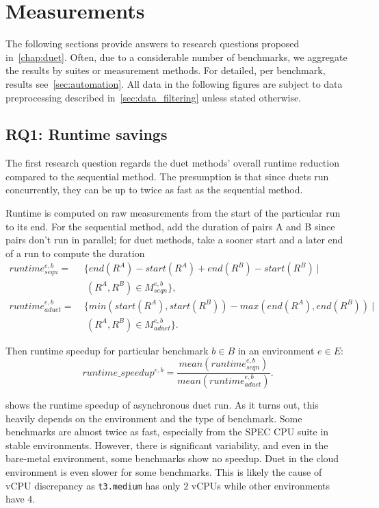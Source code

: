 \section{Measurements}
\label{sec:measurements}

The following sections provide answers to research questions proposed in~\cref{chap:duet}.
Often, due to a considerable number of benchmarks, we aggregate the results by suites or measurement methods.
For detailed, per benchmark, results see~\cref{sec:automation}.
All data in the following figures are subject to data preprocessing described in~\cref{sec:data_filtering} unless stated otherwise.

\subsection{RQ1: Runtime savings}
\label{sec:rq1}

The first research question regards the duet methods' overall runtime reduction compared to the sequential method.
The presumption is that since duets run concurrently, they can be up to twice as fast as the sequential method.

Runtime is computed on raw measurements from the start of the particular run to its end.
For the sequential method, add the duration of pairs A and B since pairs don't run in parallel; for duet methods, take a sooner start and a later end of a run to compute the duration
\begin{align*}
runtime^{e, b}_{seqn}  =&~\{end(R^A) - start(R^A) + end(R^B) - start(R^B)~|\\
                        &~~(R^A, R^B) \in M^{e, b}_{seqn}\}, \\
runtime^{e, b}_{aduet} =&~\{min(start(R^A), start(R^B)) - max(end(R^A), end(R^B))~|\\
                        &~~(R^A, R^B) \in M^{e, b}_{aduet}\}.
\end{align*}

Then runtime speedup for particular benchmark $b \in B$ in an environment $e \in E$:
\begin{equation}\label{eq:runtimespeedup}
runtime\_speedup^{e, b} = \frac{mean(runtime^{e, b}_{seqn})}{mean(runtime^{e, b}_{aduet})}.
\end{equation}

 shows the runtime speedup of asynchronous duet run.
As it turns out, this heavily depends on the environment and the type of benchmark.
Some benchmarks are almost twice as fast, especially from the SPEC CPU suite in stable environments.
However, there is significant variability, and even in the \mbox{bare-metal} environment, some benchmarks show no speedup.
Duet in the cloud environment is even slower for some benchmarks.
This is likely the cause of vCPU discrepancy as \lstinline{t3.medium} has only $2$ vCPUs while other environments have $4$.

